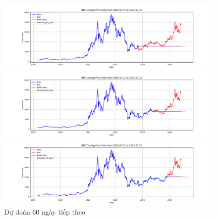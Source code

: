 \documentclass[conference]{IEEEtran}
\begin{document}
\begin{figure}[H]
    \centering
    \begin{minipage}{0.15\textwidth}
    \centering
    \includegraphics[width=1\textwidth]{Figure/ARIMA_ETH_60days_73.png}
    \end{minipage}
    \hfill
    \begin{minipage}{0.15\textwidth}
    \centering
    \includegraphics[width=1\textwidth]{Figure/ARIMA_ETH_60days_82.png}
    \end{minipage}
    \hfill
    \begin{minipage}{0.15\textwidth}
    \centering
    \includegraphics[width=1\textwidth]{Figure/ARIMA_ETH_60days_91.png}
    \end{minipage}
    \caption{Dự đoán 60 ngày tiếp theo}
    \label{fig:1}
\end{figure}
\end{document}
